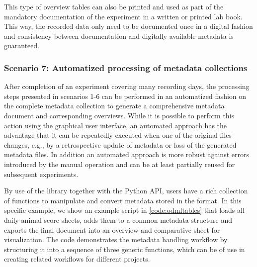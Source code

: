 This type of overview tables can also be printed and used as part of the mandatory documentation of the experiment in a written or printed lab book. This way, the recorded data only need to be documented once in a digital fashion and consistency between documentation and digitally available metadata is guaranteed. 

\subsubsection*{Scenario 7: Automatized processing of metadata collections}
After completion of an experiment covering many recording days, the processing steps presented in scenarios 1-6 can be performed in an automatized fashion on the complete metadata collection to generate a comprehensive metadata document and corresponding overviews. While it is possible to perform this action using the graphical user interface, an automated approach has the advantage that it can be repeatedly executed when one of the original files changes, e.g., by a retrospective update of metadata or loss of the generated metadata files. In addition an automated approach is more robust against errors introduced by the manual operation and can be at least partially reused for subsequent experiments.

By use of the  library together with the  Python API, users have a rich collection of functions to manipulate and convert metadata stored in the  format. In this specific example, we show an example script in \cref{code:odmltables} that loads all daily animal score sheets, adds them to a common metadata structure and exports the final document into an overview and comparative  sheet for visualization. The code demonstrates the metadata handling workflow by structuring it into a sequence of three generic functions, which can be of use in creating related workflows for different projects.





